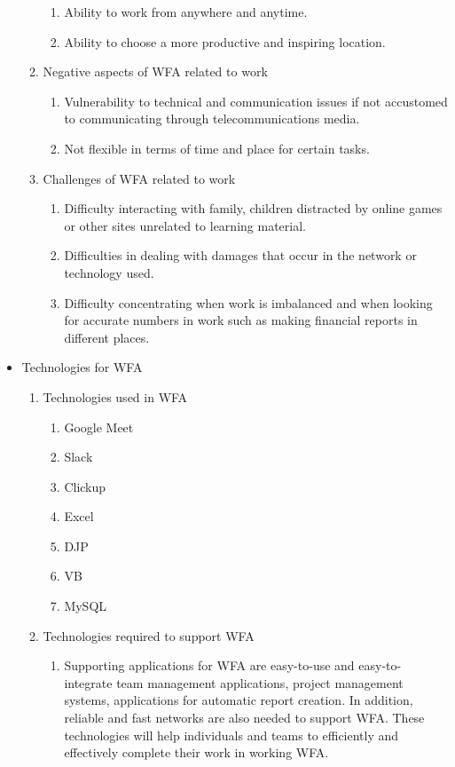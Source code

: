 \documentclass[conference]{IEEEtran}
\begin{document}
\begin{itemize}
\begin{enumerate}
\begin{enumerate}
\item Ability to work from anywhere and anytime.
\item Ability to choose a more productive and inspiring location.
\end{enumerate}
\item {Negative aspects of WFA related to work}
\begin{enumerate}
\item Vulnerability to technical and communication issues if not accustomed to communicating through telecommunications media.
\item Not flexible in terms of time and place for certain tasks.
\end{enumerate}
\item Challenges of WFA related to work
\begin{enumerate}
\item Difficulty interacting with family, children distracted by online games or other sites unrelated to learning material.
\item Difficulties in dealing with damages that occur in the network or technology used.
\item Difficulty concentrating when work is imbalanced and when looking for accurate numbers in work such as making financial reports in different places.
\end{enumerate}
\end{enumerate}
\item {Technologies for WFA}
\begin{enumerate}
\item Technologies used in WFA 
\begin{enumerate}
\item Google Meet
\item Slack
\item Clickup
\item Excel
\item DJP
\item VB
\item MySQL
\end{enumerate}
\item Technologies required to support WFA
\begin{enumerate}
\item[] Supporting applications for WFA are easy-to-use and easy-to-integrate team management applications, project management systems, applications for automatic report creation. In addition, reliable and fast networks are also needed to support WFA. These technologies will help individuals and teams to efficiently and effectively complete their work in working WFA.
\end{enumerate}


\end{enumerate}
\end{itemize}
\end{document}
